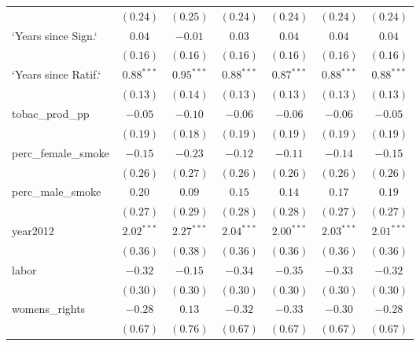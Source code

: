 \begin{table}[!h]
\begin{center}
\begin{tabular}{l c c c c c c }
                        & $(0.24)$     & $(0.25)$     & $(0.24)$     & $(0.24)$     & $(0.24)$     & $(0.24)$     \\
`Years since Sign.`     & $0.04$       & $-0.01$      & $0.03$       & $0.04$       & $0.04$       & $0.04$       \\
                        & $(0.16)$     & $(0.16)$     & $(0.16)$     & $(0.16)$     & $(0.16)$     & $(0.16)$     \\
`Years since Ratif.`    & $0.88^{***}$ & $0.95^{***}$ & $0.88^{***}$ & $0.87^{***}$ & $0.88^{***}$ & $0.88^{***}$ \\
                        & $(0.13)$     & $(0.14)$     & $(0.13)$     & $(0.13)$     & $(0.13)$     & $(0.13)$     \\
tobac\_prod\_pp         & $-0.05$      & $-0.10$      & $-0.06$      & $-0.06$      & $-0.06$      & $-0.05$      \\
                        & $(0.19)$     & $(0.18)$     & $(0.19)$     & $(0.19)$     & $(0.19)$     & $(0.19)$     \\
perc\_female\_smoke     & $-0.15$      & $-0.23$      & $-0.12$      & $-0.11$      & $-0.14$      & $-0.15$      \\
                        & $(0.26)$     & $(0.27)$     & $(0.26)$     & $(0.26)$     & $(0.26)$     & $(0.26)$     \\
perc\_male\_smoke       & $0.20$       & $0.09$       & $0.15$       & $0.14$       & $0.17$       & $0.19$       \\
                        & $(0.27)$     & $(0.29)$     & $(0.28)$     & $(0.28)$     & $(0.27)$     & $(0.27)$     \\
year2012                & $2.02^{***}$ & $2.27^{***}$ & $2.04^{***}$ & $2.00^{***}$ & $2.03^{***}$ & $2.01^{***}$ \\
                        & $(0.36)$     & $(0.38)$     & $(0.36)$     & $(0.36)$     & $(0.36)$     & $(0.36)$     \\
labor                   & $-0.32$      & $-0.15$      & $-0.34$      & $-0.35$      & $-0.33$      & $-0.32$      \\
                        & $(0.30)$     & $(0.30)$     & $(0.30)$     & $(0.30)$     & $(0.30)$     & $(0.30)$     \\
womens\_rights          & $-0.28$      & $0.13$       & $-0.32$      & $-0.33$      & $-0.30$      & $-0.28$      \\
                        & $(0.67)$     & $(0.76)$     & $(0.67)$     & $(0.67)$     & $(0.67)$     & $(0.67)$     \\

\end{tabular}
\end{center}
\end{table}
